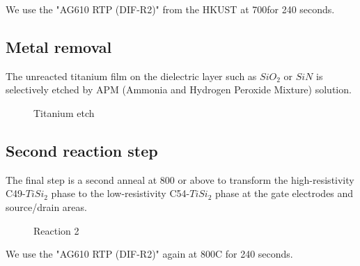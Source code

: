 We use the "AG610 RTP (DIF-R2)" from the HKUST at 700\degreesC for 240 seconds.

\subsection{Metal removal}

The unreacted titanium film on the dielectric layer such as $SiO_2$ or $SiN$ is selectively etched by APM (Ammonia and Hydrogen Peroxide Mixture) solution.

\begin{figure}[H]
	\centering
	\begin{tikzpicture}[node distance = 3cm, auto, thick,scale=\CrossSectionOnly, every node/.style={transform shape}]
		
	\end{tikzpicture}
	\drawStepArrow{}
	\begin{tikzpicture}[node distance = 3cm, auto, thick,scale=\CrossSectionOnly, every node/.style={transform shape}]
		
	\end{tikzpicture}
	\caption{Titanium etch}
\end{figure}

\subsection{Second reaction step}

The final step is a second anneal at 800 \degreesC or above to transform the high-resistivity C49-$TiSi_2$ phase to the low-resistivity C54-$TiSi_2$ phase at the gate electrodes and source/drain areas.

\begin{figure}[H]
	\centering
	\begin{tikzpicture}[node distance = 3cm, auto, thick,scale=\CrossSectionOnly, every node/.style={transform shape}]
		
	\end{tikzpicture}
	\drawStepArrow{}
	\begin{tikzpicture}[node distance = 3cm, auto, thick,scale=\CrossSectionOnly, every node/.style={transform shape}]
		
	\end{tikzpicture}
	\caption{Reaction 2}
\end{figure}

We use the "AG610 RTP (DIF-R2)" again at 800\degree C for 240 seconds.
